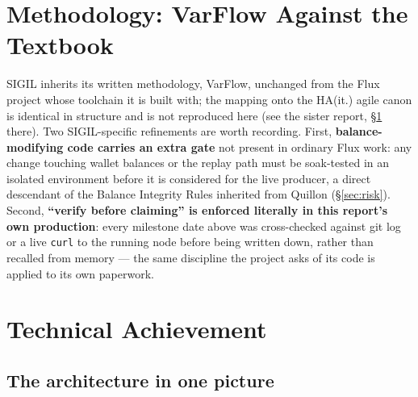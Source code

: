 \section{Methodology: VarFlow Against the Textbook}
\label{sec:method}

SIGIL inherits its written methodology, VarFlow, unchanged from the Flux project whose toolchain it is built with; the mapping onto the HA(it.) agile canon is identical in structure and is not reproduced here (see the sister report, \S\ref{sec:method} there). Two SIGIL-specific refinements are worth recording. First, \textbf{balance-modifying code carries an extra gate} not present in ordinary Flux work: any change touching wallet balances or the replay path must be soak-tested in an isolated environment before it is considered for the live producer, a direct descendant of the Balance Integrity Rules inherited from Quillon (\S\ref{sec:risk}). Second, \textbf{``verify before claiming'' is enforced literally in this report's own production}: every milestone date above was cross-checked against git log or a live \texttt{curl} to the running node before being written down, rather than recalled from memory --- the same discipline the project asks of its code is applied to its own paperwork.

\section{Technical Achievement}

\subsection{The architecture in one picture}

